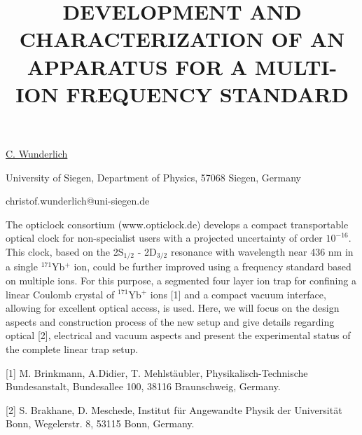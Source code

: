 \title{DEVELOPMENT AND CHARACTERIZATION OF AN APPARATUS FOR A MULTI-ION FREQUENCY STANDARD}

\underline{C. Wunderlich} 

{\normalsize{\vspace{-4mm}
University of Siegen, Department of Physics, 57068 Siegen, Germany



\email christof.wunderlich@uni-siegen.de}}

The opticlock consortium (www.opticlock.de) develops a compact transportable optical clock for non-specialist users with a projected uncertainty of order $10^{-16}$. This clock, based on the 2S$_{1/2}$ - 2D$_{3/2}$ resonance with wavelength near 436 nm in a single $^{171}$Yb$^+$ ion, could be further improved using a frequency standard based on multiple ions. For this purpose, a segmented four layer ion trap for confining a linear Coulomb crystal of $^{171}$Yb$^+$ ions [1] and a compact vacuum interface, allowing for excellent optical access, is used. Here, we will focus on the design aspects and construction process of the new setup and give details regarding optical [2], electrical and vacuum aspects and present the experimental status of the complete linear trap setup.

{\normalsize
[1] M. Brinkmann, A.Didier, T. Mehlst\"aubler, Physikalisch-Technische Bundesanstalt,
Bundesallee 100, 38116 Braunschweig, Germany.

[2] S. Brakhane, D. Meschede, Institut f\"ur Angewandte Physik der Universit\"at Bonn, Wegelerstr. 8, 53115 Bonn, Germany.
}

\vspace{\baselineskip}